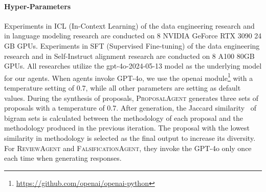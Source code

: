 \documentclass{article} %
\newcommand{\ProposalAgent}{\textsc{ProposalAgent}\xspace}
\newcommand{\ReviewAgent}{\textsc{ReviewAgent}\xspace}
\newcommand{\FalsificationAgent}{\textsc{FalsificationAgent}\xspace}
\begin{document}
\paragraph{Hyper-Parameters}
Experiments in ICL (In-Context Learning) of the data engineering research and in language modeling research are conducted on 8 NVIDIA GeForce RTX 3090 24 GB GPUs. Experiments in SFT (Supervised Fine-tuning) of the data engineering research and in Self-Instruct alignment research are conducted on 8 A100 80GB GPUs. All researches utilize the gpt-4o-2024-05-13 model as the underlying model for our agents. When agents invoke GPT-4o, we use the openai module\footnote{\url{https://github.com/openai/openai-python}} with a temperature setting of 0.7, while all other parameters are setting as default values. During the synthesis of proposals, \ProposalAgent generates three sets of proposals with a temperature of 0.7. After generation, the Jaccard similarity~\citep{jaccard1901etude} of bigram sets is calculated between the methodology of each proposal and the methodology produced in the previous iteration. The proposal with the lowest similarity in methodology is selected as the final output to increase its diversity. For \ReviewAgent and \FalsificationAgent, they invoke the GPT-4o only once each time when generating responses.
\end{document}
